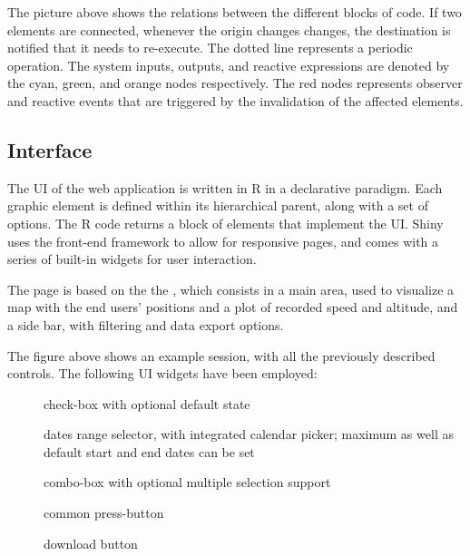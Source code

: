 
The picture above shows the relations between the different blocks of code.
If two elements are connected, whenever the origin changes changes, the destination is notified that it needs to re-execute.
The dotted line represents a periodic operation.
The system inputs, outputs, and reactive expressions are denoted by the cyan, green, and orange nodes respectively.
The red nodes represents observer and reactive events that are triggered by the invalidation of the affected elements.


\subsection{Interface}
The UI of the web application is written in R in a declarative paradigm.
Each graphic element is defined within its hierarchical parent, along with a set of options.
The R code returns a block of  elements that implement the UI.
Shiny uses the  front-end framework to allow for responsive pages, and comes with a series of built-in widgets for user interaction.

The page is based on the the , which consists in a main area, used to visualize a map with the end users' positions and a plot of recorded speed and altitude, and a side bar, with filtering and data export options.


The figure above shows an example session, with all the previously described controls.
The following UI widgets have been employed:

\begin{description}
	\item[] check-box with optional default state
	\item[] dates range selector, with integrated calendar picker; maximum as well as default start and end dates can be set
	\item[] combo-box with optional multiple selection support
	\item[] common press-button
	\item[] download button
\end{description}

